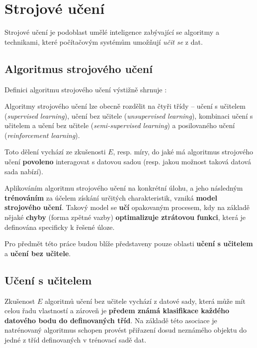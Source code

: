 \section{Strojové učení}
Strojové učení je podoblast umělé inteligence zabývající se algoritmy a technikami, které počítačovým systémům umožňují \emph{učit se} z dat.
\begin{definition}
    \label{def:machine_learning}
     \cite{Samuel1967}
\end{definition}
\subsection{Algoritmus strojového učení}
\label{sec:machine_learning_algorithm}
Definici algoritmu strojového učení výstižně shrnuje \textcite[str. 2]{Mitchell1997}:
\begin{definition}
    \label{def:machine_learning_algorithm}
\end{definition}
Algoritmy strojového učení lze obecně rozdělit na čtyři třídy – učení s učitelem (\emph{supervised learning}),
učení bez učitele (\emph{unsupervised learning}), kombinaci učení s učitelem a učení bez učitele (\emph{semi-supervised learning}) a posilovaného učení (\emph{reinforcement learning}).

Toto dělení vychází ze zkušenosti $E$, resp. míry, do jaké má algoritmus strojového učení \textbf{povoleno} interagovat s datovou sadou (resp. jakou možnost taková datová sada nabízí). \cite{Goodfellow2016}

Aplikováním algoritmu strojového učení na konkrétní úlohu, a jeho následným \textbf{trénováním} za účelem získání určitých charakteristik, vzniká \textbf{model strojového učení}.
Takový model se \textbf{učí} opakovaným procesem, kdy na základě nějaké \textbf{chyby} (forma zpětné vazby) \textbf{optimalizuje ztrátovou funkci}, která je definována specificky k řešené úloze.

Pro předmět této práce budou blíže představeny pouze oblasti \textbf{učení s učitelem} a \textbf{učení bez učitele}.
\subsection{Učení s učitelem}
\label{sec:supervised_learning}
Zkušenost $E$ algoritmů učení bez učitele vychází z datové sady, která může mít celou řadu vlastností a zároveň je \textbf{předem známá klasifikace každého datového bodu do definovaných tříd}.
Na základě této asociace je natrénovaný algoritmus schopen provést přiřazení dosud neznámého objektu do jedné z tříd definovaných v trénovací sadě dat. \cite{Chollet2017}

